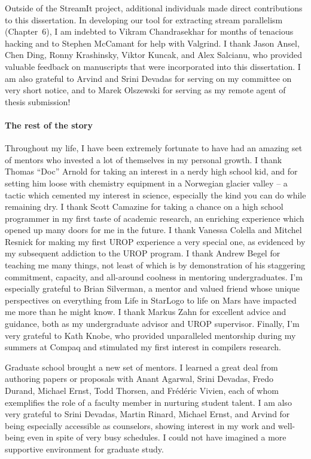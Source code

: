 Outside of the StreamIt project, additional individuals made direct
contributions to this dissertation.  In developing our tool for
extracting stream parallelism (Chapter~6), I am indebted to Vikram
Chandrasekhar for months of tenacious hacking and to Stephen McCamant
for help with Valgrind.  I thank Jason Ansel, Chen Ding, Ronny
Krashinsky, Viktor Kuncak, and Alex Salcianu, who provided valuable
feedback on manuscripts that were incorporated into this dissertation.
I am also grateful to Arvind and Srini Devadas for serving on my
committee on very short notice, and to Marek Olszewski for serving as
my remote agent of thesis submission!

\vspace{-8pt}\paragraph*{The rest of the story} Throughout my life,
I have been extremely fortunate to have had an amazing set of
mentors who invested a lot of themselves in my personal growth.  I
thank Thomas ``Doc'' Arnold for taking an interest in a nerdy high
school kid, and for setting him loose with chemistry equipment in a
Norwegian glacier valley -- a tactic which cemented my interest in
science, especially the kind you can do while remaining dry.
I thank Scott Camazine for taking a chance on a high school programmer
in my first taste of academic research, an enriching experience which
opened up many doors for me in the future.  I thank Vanessa Colella
and Mitchel Resnick for making my first UROP experience a very
special one, as evidenced by my subsequent addiction to the UROP
program.  I thank Andrew Begel for teaching me many things, not
least of which is by demonstration of his staggering commitment,
capacity, and all-around coolness in mentoring undergraduates.  I'm
especially grateful to Brian Silverman, a mentor and valued friend
whose unique perspectives on everything from Life in StarLogo to
life on Mars have impacted me more than he might know.  I thank
Markus Zahn for excellent advice and guidance, both as my
undergraduate advisor and UROP supervisor.  Finally, I'm very
grateful to Kath Knobe, who provided unparalleled mentorship during
my summers at Compaq and stimulated my first interest in compilers
research.

Graduate school brought a new set of mentors.  I learned a great
deal from authoring papers or proposals with Anant Agarwal, Srini
Devadas, Fredo Durand, Michael Ernst, Todd Thorsen, and
Fr\'{e}d\'{e}ric Vivien, each of whom exemplifies the role of a
faculty member in nurturing student talent.  I am also very grateful
to Srini Devadas, Martin Rinard, Michael Ernst, and Arvind for being
especially accessible as counselors, showing interest in my work and
well-being even in spite of very busy schedules.  I could not have
imagined a more supportive environment for graduate study.


